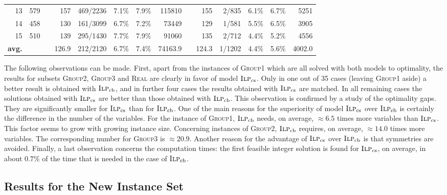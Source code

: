 \documentclass[11pt,a4paper]{article}
\newcommand{\MIPorig}{\textsc{Ilp}_{\mathrm{cb}}}
\newcommand{\MIPalt}{\textsc{Ilp}_{\mathrm{cs}}}
\newcommand{\ccg}{\cellcolor{lightgray}}
\begin{document}
\begin{table}[t!]
{\begin{tabular}{rrrrrrrrrrrrrr}
13         & 579 &&     157    &	   469/2236 & 7.1\% & 7.9\%  & 115810    &&      \ccg155 &    2/835   & 6.1\%   & 6.7\% & 5251 \\
14         & 458 &&     130    &	   161/3099 & 6.7\% & 7.2\%  & 73449     &&      \ccg129 &    1/581   & 5.5\%   & 6.5\% & 3905  \\
15         & 510 &&     139    &	   295/1430 & 7.7\% & 7.9\%  & 91060     &&      \ccg135 &    2/712   & 4.4\%   & 5.2\% & 4556  \\ \hline
{\bf avg.} & &&     126.9  &         212/2120 & 6.7\% & 7.4\%  & 74163.9   &&    \ccg124.3 &    1/1202  & 4.4\%   & 5.6\% &  4002.0 \\
\hline\hline
\end{tabular}}
\end{table}


The following observations can be made. First, apart from the instances
of \textsc{Group1} which are all solved with both models to optimality, the
results for subsets \textsc{Group2}, \textsc{Group3} and \textsc{Real}
are clearly in favor of model $\MIPalt$. Only in one out of 35 cases
(leaving \textsc{Group1} aside) a better result is obtained with
$\MIPorig$, and in further four cases the results obtained with
$\MIPalt$ are matched. In all remaining cases the solutions obtained
with $\MIPalt$ are better than those obtained with $\MIPorig$. This
observation is confirmed by a study of the optimality gaps. They are
significantly smaller for $\MIPalt$ than for $\MIPorig$. One of the main reasons for the superiority of model $\MIPalt$ over $\MIPorig$ is certainly the difference in the number of the variables. For the instance of \textsc{Group1}, $\MIPorig$ needs, on average, $\approx6.5$ times more variables than $\MIPalt$. This factor seems to grow with growing instance size. Concerning instances of \textsc{Group2}, $\MIPorig$ requires, on average, $\approx 14.0$ times more variables. The corresponding number for \textsc{Group3} is $\approx 20.9$. Another reason for the advantage of $\MIPalt$ over $\MIPorig$ is that symmetries are avoided. Finally, a
last observation concerns the computation times: the first feasible
integer solution is found for $\MIPalt$, on average, in about $0.7\%$ of
the time that is needed in the case of $\MIPorig$. 

\subsection{Results for the New Instance Set}
\end{document}
